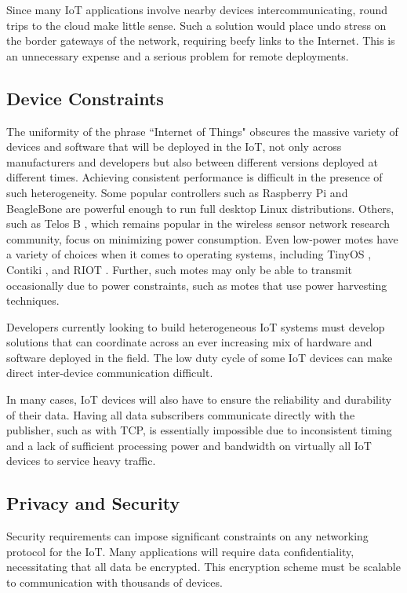 Since many IoT applications involve nearby devices intercommunicating, round trips to the cloud make little sense. Such a solution would place undo stress on the border gateways of the network, requiring beefy links to the Internet. This is an unnecessary expense and a serious problem for remote deployments.

\subsection{Device Constraints}
The uniformity of the phrase ``Internet of Things" obscures the massive variety of devices and software that will be deployed in the IoT, not only across manufacturers and developers but also between different versions deployed at different times.  Achieving consistent performance is difficult in the presence of such heterogeneity. Some popular controllers such as Raspberry Pi \cite{RaspberryPi} and BeagleBone \cite{BeagleBone} are powerful enough to run full desktop Linux distributions.  Others, such as Telos B \cite{Telos}, which remains popular in the wireless sensor network research community, focus on minimizing power consumption.  Even low-power motes have a variety of choices when it comes to operating systems, including TinyOS \cite{tinyos}, Contiki \cite{contiki}, and RIOT \cite{riot}.  Further, such motes may only be able to transmit occasionally due to power constraints, such as motes that use power harvesting techniques.

Developers currently looking to build heterogeneous IoT systems must develop solutions that can coordinate across an ever increasing mix of hardware and software deployed in the field.  The low duty cycle of some IoT devices can make direct inter-device communication difficult.

In many cases, IoT devices will also have to ensure the reliability and durability of their data. Having all data subscribers communicate directly with the publisher, such as with TCP, is essentially impossible due to inconsistent timing and a lack of sufficient processing power and bandwidth on virtually all IoT devices to service heavy traffic. 

\subsection{Privacy and Security}
Security requirements can impose significant constraints on any networking protocol for the IoT.  Many applications will require data confidentiality, necessitating that all data be encrypted.  This encryption scheme must be scalable to communication with thousands of devices.


